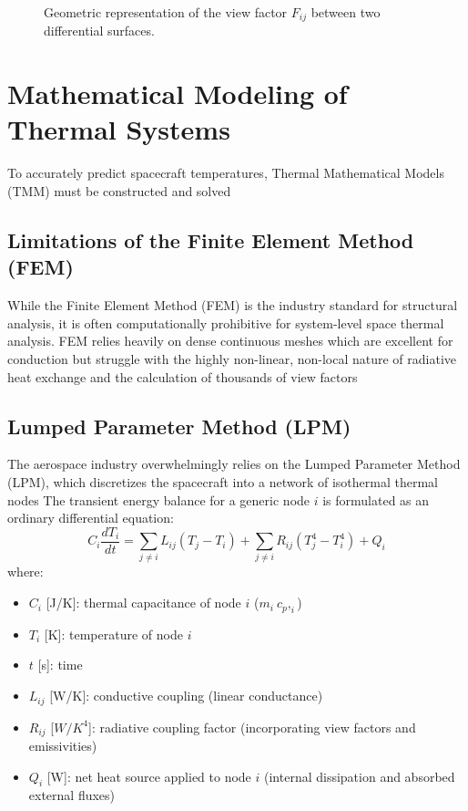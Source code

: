 \begin{figure}[htpb]
    \centering
    \caption{Geometric representation of the view factor $F_{ij}$ between two differential surfaces.}
    \label{fig:view_factor}
\end{figure}

\section{Mathematical Modeling of Thermal Systems}
To accurately predict spacecraft temperatures, Thermal Mathematical Models (TMM) must be constructed 
and solved %

\subsection{Limitations of the Finite Element Method (FEM)}
While the Finite Element Method (FEM) is the industry standard for structural analysis, 
it is often computationally prohibitive for system-level space thermal analysis. FEM relies heavily on 
dense continuous meshes which are excellent for conduction but struggle with the highly non-linear, 
non-local nature of radiative heat exchange and the calculation of thousands of view factors %

\subsection{Lumped Parameter Method (LPM)}
The aerospace industry overwhelmingly relies on the Lumped Parameter Method (LPM), which discretizes
 the spacecraft into a network of isothermal thermal nodes %
 The transient energy balance for a generic node $i$ is formulated as an ordinary differential equation:
\begin{equation}
    C_i \frac{dT_i}{dt} = \sum_{j \neq i} L_{ij} (T_j - T_i) + \sum_{j \neq i} R_{ij} (T_j^4 - T_i^4) + Q_{i}
\end{equation}
where:
\begin{itemize}[label={\scriptsize\raisebox{0.5ex}{\textbullet}}]
  \item$C_i$ [J/K]: thermal capacitance of node $i$ ($m_i\ c_p,_i$)
  \item$T_i$ [K]: temperature of node $i$
  \item$t$ [s]: time
  \item$L_{ij}$ [W/K]: conductive coupling (linear conductance)
  \item$R_{ij}$ [$W/K^4$]: radiative coupling factor (incorporating view factors and emissivities)
  \item$Q_i$ [W]: net heat source applied to node $i$ (internal dissipation and absorbed external fluxes)
\end{itemize} 

